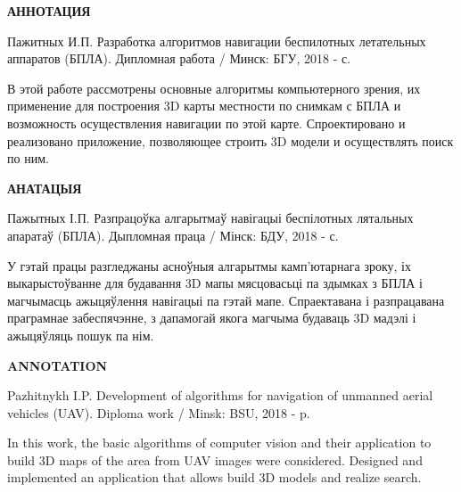\begin{center}
     \large\bfseries{АННОТАЦИЯ}
\end{center}

Пажитных И.П. Разработка алгоритмов навигации беспилотных летательных аппаратов (БПЛА). Дипломная работа / Минск: БГУ, 2018 - \pageref{LastPage} с.

В этой работе рассмотрены основные алгоритмы компьютерного зрения, их применение для построения 3D карты местности по снимкам с БПЛА и возможность осуществления навигации по этой карте. Спроектировано и реализовано приложение, позволяющее строить 3D модели и осуществлять поиск по ним.

\begin{center}
     \large\bfseries{АНАТАЦЫЯ}
\end{center}

Пажытных І.П. Разпрацоўка алгарытмаў навігацыі беспілотных лятальных апаратаў (БПЛА). Дыпломная праца / Мінск: БДУ, 2018 - \pageref{LastPage} с.

У гэтай працы разгледжаны асноўныя алгарытмы камп'ютарнага зроку, іх выкарыстоўванне для будавання 3D мапы мясцовасьці па здымках з БПЛА і магчымасць ажыцяўлення навігацыі па гэтай мапе. Спраектавана і разпрацавана праграмнае забеспячэнне, з дапамогай якога магчыма будаваць 3D мадэлі і ажыцяўляць пошук па нім.

\begin{center}
     \large\bfseries{ANNOTATION}
\end{center}

Pazhitnykh I.P. Development of algorithms for navigation of unmanned aerial vehicles (UAV). Diploma work / Minsk: BSU, 2018 - \pageref{LastPage} p.

In this work, the basic algorithms of computer vision and their application to build 3D maps of the area from UAV images were considered. Designed and implemented an application that allows build 3D models and realize search.

\newpage
